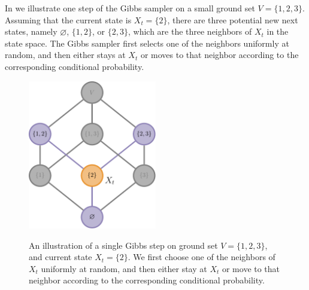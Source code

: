 In  we illustrate one step of the Gibbs sampler on a small ground set $V = \{1, 2, 3\}$.
Assuming that the current state is $X_t = \{2\}$, there are three potential new next states, namely $\varnothing$, $\{1, 2\}$, or $\{2, 3\}$, which are the three neighbors of $X_t$ in the state space.
The Gibbs sampler first selects one of the neighbors uniformly at random, and then either stays at $X_t$ or moves to that neighbor according to the corresponding conditional probability.


\vspace{1em}
\begin{figure}[p]
\centering
\includegraphics[width=0.5\textwidth]{figures/gibbs/lattice_gibbs_2.pdf}\\[1em]
\caption{An illustration of a single Gibbs step on ground set $V = \{1, 2, 3\}$, and current state $X_t = \{2\}$.
We first choose one of the neighbors of $X_t$ uniformly at random, and then either stay at $X_t$ or move to that neighbor according to the corresponding conditional probability.}
\label{fig:gibbs}
\end{figure}

